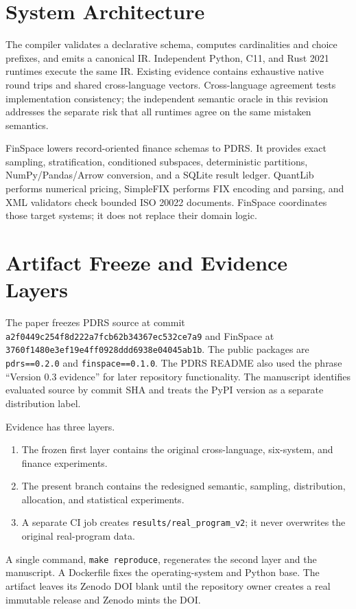 \documentclass[10pt]{article}
\begin{document}
\section{System Architecture}
The compiler validates a declarative schema, computes cardinalities and choice prefixes, and emits a canonical IR. Independent Python, C11, and Rust 2021 runtimes execute the same IR. Existing evidence contains exhaustive native round trips and shared cross-language vectors. Cross-language agreement tests implementation consistency; the independent semantic oracle in this revision addresses the separate risk that all runtimes agree on the same mistaken semantics.

FinSpace lowers record-oriented finance schemas to PDRS. It provides exact sampling, stratification, conditioned subspaces, deterministic partitions, NumPy/Pandas/Arrow conversion, and a SQLite result ledger. QuantLib performs numerical pricing, SimpleFIX performs FIX encoding and parsing, and XML validators check bounded ISO 20022 documents. FinSpace coordinates those target systems; it does not replace their domain logic.

\section{Artifact Freeze and Evidence Layers}
The paper freezes PDRS source at commit
\texttt{a2f0449c254f8d222a7fcb62b34367ec532ce7a9} and FinSpace at
\texttt{3760f1480e3ef19e4ff0928ddd6938e04045ab1b}. The public packages are
\texttt{pdrs==0.2.0} and \texttt{finspace==0.1.0}. The PDRS README also used the phrase ``Version 0.3 evidence'' for later repository functionality. The manuscript identifies evaluated source by commit SHA and treats the PyPI version as a separate distribution label.

Evidence has three layers.
\begin{enumerate}
  \item The frozen first layer contains the original cross-language, six-system, and finance experiments.
  \item The present branch contains the redesigned semantic, sampling, distribution, allocation, and statistical experiments.
  \item A separate CI job creates \texttt{results/real\_program\_v2}; it never overwrites the original real-program data.
\end{enumerate}
A single command, \texttt{make reproduce}, regenerates the second layer and the manuscript. A Dockerfile fixes the operating-system and Python base. The artifact leaves its Zenodo DOI blank until the repository owner creates a real immutable release and Zenodo mints the DOI.
\end{document}
